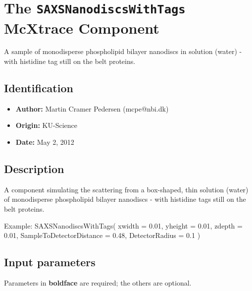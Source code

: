 \section{The \texttt{SAXSNanodiscsWithTags} McXtrace Component}
A sample of monodisperse phospholipid bilayer nanodiscs in solution (water) - with
histidine tag still on the belt proteins.

\subsection*{Identification}
\begin{itemize}
  \item \textbf{Author:} Martin Cramer Pedersen (mcpe@nbi.dk)
  \item \textbf{Origin:} KU-Science
  \item \textbf{Date:} May 2, 2012
\end{itemize}

\subsection*{Description}
A component simulating the scattering from a box-shaped, thin solution (water) of monodisperse phospholipid bilayer nanodiscs - with histidine tags still on the belt proteins.

Example: SAXSNanodiscsWithTags( xwidth = 0.01, yheight = 0.01, zdepth = 0.01, SampleToDetectorDistance = 0.48, DetectorRadius = 0.1 )

\subsection*{Input parameters}
Parameters in \textbf{boldface} are required; the others are optional.

